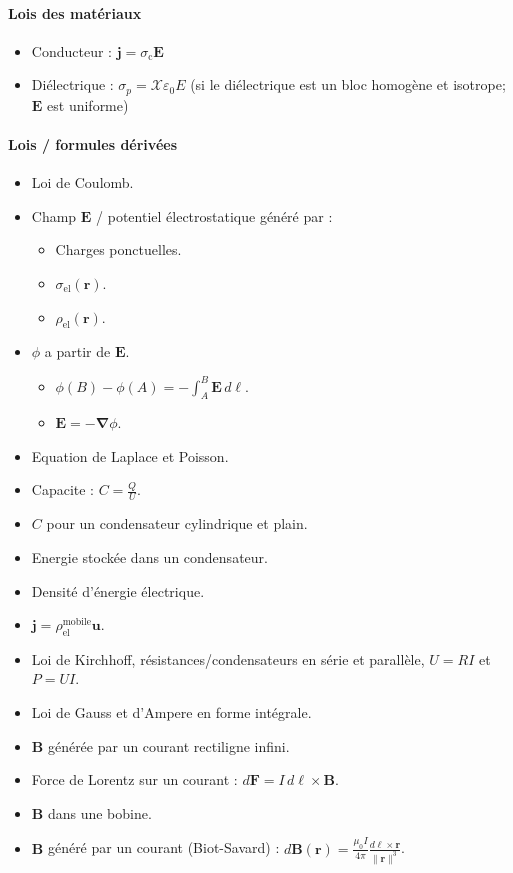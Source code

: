 \paragraph{Lois des matériaux}
\begin{itemize}
\item Conducteur : $\boldsymbol{j}=\sigma _{\mathrm{c}}\boldsymbol{E}$
\item Diélectrique : $\sigma _{p}=\mathcal{X}\varepsilon_{0}E$ (si le diélectrique est un bloc homogène et isotrope; $\boldsymbol{E}$ est uniforme)
\end{itemize}
\paragraph{Lois / formules dérivées}
\begin{itemize}
\item Loi de Coulomb.
\item Champ $\boldsymbol{E}$ / potentiel électrostatique généré par :
\begin{itemize}
\item Charges ponctuelles.
\item $\sigma _{\mathrm{el}}(\boldsymbol{r})$.
\item $\rho _{\mathrm{el}}(\boldsymbol{r})$.
\end{itemize}
\item $\phi$ a partir de $\boldsymbol{E}$. 
\begin{itemize}
\item $\phi(B)-\phi(A)=-\int_{A}^{B}\boldsymbol{E}  \, d\boldsymbol{\ell}$.
\item $\boldsymbol{E}=-\boldsymbol{\nabla}\phi$.
\end{itemize}
\item Equation de Laplace et Poisson.
\item Capacite : $C=\frac{Q}{U}$.
\item $C$ pour un condensateur cylindrique et plain.
\item Energie stockée dans un condensateur.
\item Densité d'énergie électrique.
\item $\boldsymbol{j}=\rho _{\mathrm{el}}^{\mathrm{mobile}}\boldsymbol{u}$.
\item Loi de Kirchhoff,  résistances/condensateurs en série et parallèle, $U=RI$ et $P=UI$.
\item Loi de Gauss et d'Ampere en forme intégrale.
\item $\boldsymbol{B}$ générée par un courant rectiligne infini.
\item Force de Lorentz sur un courant : $d\boldsymbol{F}=I\,d\boldsymbol{\ell}\times \boldsymbol{B}$.
\item $\boldsymbol{B}$ dans une bobine.
\item $\boldsymbol{B}$ généré par un courant (Biot-Savard) : $d\boldsymbol{B}(\boldsymbol{r})=\frac{\mu_{0}I}{4\pi} \frac{d\boldsymbol{\ell}\times \boldsymbol{r}}{\lVert \boldsymbol{r} \rVert^{3}}$.
\end{itemize}

